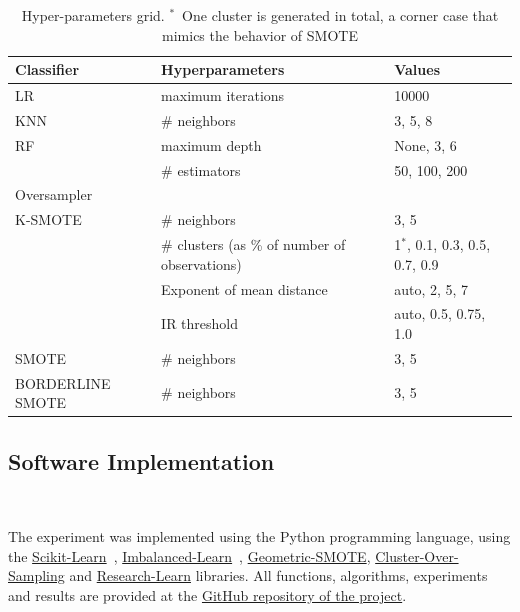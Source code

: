 \documentclass[parskip=full]{scrartcl}
\begin{document}
\begin{table}[H]
	\centering
	\begin{tabular}{lll}
		\toprule
		Classifier       & Hyperparameters      & Values                            \\
		\midrule
		LR               & maximum iterations   & 10000                             \\
		KNN              & \# neighbors  & {3, 5, 8}                            \\
		RF               & maximum depth        & {None, 3, 6}                      \\
		                 & \# estimators & {50, 100, 200}                         \\
		\toprule
		Oversampler      &                      &                                   \\
		\midrule
		K-SMOTE          & \# neighbors  & {3, 5}                            \\
		                 & \# clusters (as \% of number of observations)   & {1$^*$, 0.1, 0.3, 0.5, 0.7, 0.9}      \\
                         & Exponent of mean distance & {auto, 2, 5, 7}       \\
                         & IR threshold  & {auto, 0.5, 0.75, 1.0}            \\
		SMOTE            & \# neighbors  & {3, 5}                            \\
		BORDERLINE SMOTE & \# neighbors  & {3, 5}                            \\
		\bottomrule
	\end{tabular}
    \caption{\label{tab:grid}Hyper-parameters grid. $^*$~One cluster is generated in total, a corner
        case that mimics the behavior of SMOTE}
\end{table}

\subsection{Software Implementation}~\label{sec:implementation}

The experiment was implemented using the Python programming language, using the
\href{https://scikit-learn.org/stable/}{Scikit-Learn}~\cite{Pedregosa2011},
\href{https://imbalanced-learn.org/en/stable/}{Imbalanced-Learn}~\cite{JMLR:v18:16-365},
\href{https://geometric-smote.readthedocs.io/en/latest/?badge=latest}{Geometric-SMOTE},
\href{https://cluster-over-sampling.readthedocs.io/en/latest/?badge=latest}{Cluster-Over-Sampling}
and \href{https://research-learn.readthedocs.io/en/latest/?badge=latest}{Research-Learn} libraries.
All functions, algorithms, experiments and results are provided at the
\href{https://github.com/joaopfonseca/publications/tree/master/remote-sensing-kmeans-smote}{GitHub
repository of the project}.
\end{document}
